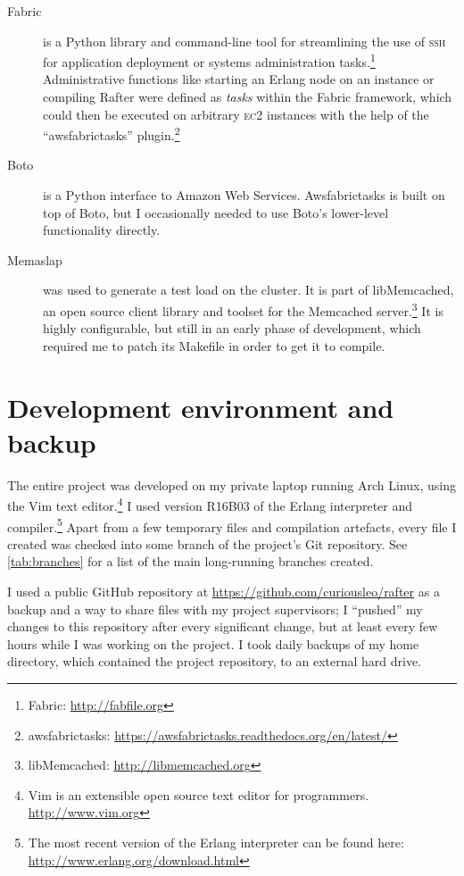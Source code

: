 \documentclass[11pt,chapterprefix=true,toc=bibliography,numbers=noendperiod,
               footnotes=multiple,twoside]{scrreprt}
\newcommand{\ECC}[0]{\textsc{ec}2 }
\begin{document}
\begin{description}
    \item[Fabric] is a Python library and command-line tool for streamlining the use of \textsc{ssh} for application deployment or systems administration tasks.\footnote{Fabric: \url{http://fabfile.org}} Administrative functions like starting an Erlang node on an instance or compiling Rafter were defined as \emph{tasks} within the Fabric framework, which could then be executed on arbitrary \ECC instances with the help of the \enquote{awsfabrictasks} plugin.\footnote{awsfabrictasks: \url{https://awsfabrictasks.readthedocs.org/en/latest/}}
    \item[Boto] is a Python interface to Amazon Web Services. Awsfabrictasks is built on top of Boto, but I occasionally needed to use Boto's lower-level functionality directly.
    \item[Memaslap] was used to generate a test load on the cluster. It is part of libMemcached, an open source client library and toolset for the Memcached server.\footnote{libMemcached: \url{http://libmemcached.org}} It is highly configurable, but still in an early phase of development, which required me to patch its Makefile in order to get it to compile.
\end{description}

\section{Development environment and backup}

The entire project was developed on my private laptop running Arch Linux, using the Vim text editor.\footnote{Vim is an extensible open source text editor for programmers. \url{http://www.vim.org}} I used version R16B03 of the Erlang interpreter and compiler.\footnote{The most recent version of the Erlang interpreter can be found here: \url{http://www.erlang.org/download.html}} Apart from a few temporary files and compilation artefacts, every file I created was checked into some branch of the project's Git repository. See \cref{tab:branches} for a list of the main long-running branches created.

I used a public GitHub repository at \url{https://github.com/curiousleo/rafter} as a backup and a way to share files with my project supervisors; I \enquote{pushed} my changes to this repository after every significant change, but at least every few hours while I was working on the project. I took daily backups of my home directory, which contained the project repository, to an external hard drive.
\end{document}
